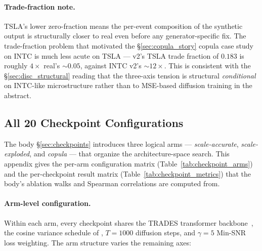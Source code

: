 \documentclass[journal]{IEEEtran}
\theoremstyle{definition}   %
\begin{document}
\paragraph{Trade-fraction note.}
TSLA's lower zero-fraction means the per-event composition of the
synthetic output is structurally closer to real even before any
generator-specific fix. The trade-fraction problem that motivated
the §\ref{sec:copula_story} copula case study on INTC is much less
acute on TSLA --- v2's TSLA trade fraction of $0.183$ is roughly
$4\times$ real's $\sim 0.05$, against INTC v2's $\sim 12\times$.
This is consistent with the §\ref{sec:disc_structural} reading
that the three-axis tension is structural \emph{conditional} on
INTC-like microstructure rather than to MSE-based diffusion training
in the abstract.

\subsection{All 20 Checkpoint Configurations}
\label{app:checkpoints}

The body §\ref{sec:checkpoints} introduces three logical arms ---
\emph{scale-accurate}, \emph{scale-exploded}, and \emph{copula}
--- that organize the architecture-space search. This appendix
gives the per-arm configuration matrix
(Table~\ref{tab:checkpoint_arms}) and the per-checkpoint result
matrix (Table~\ref{tab:checkpoint_metrics}) that the body's
ablation walks and Spearman correlations are computed from.

\paragraph{Arm-level configuration.}
Within each arm, every checkpoint shares the TRADES transformer
backbone~\cite{berti2025trades}, the cosine variance schedule of
\cite{nichol2021improved}, $T = 1000$ diffusion steps, and
$\gamma = 5$ Min-SNR loss weighting. The arm structure varies the
remaining axes:
\end{document}
